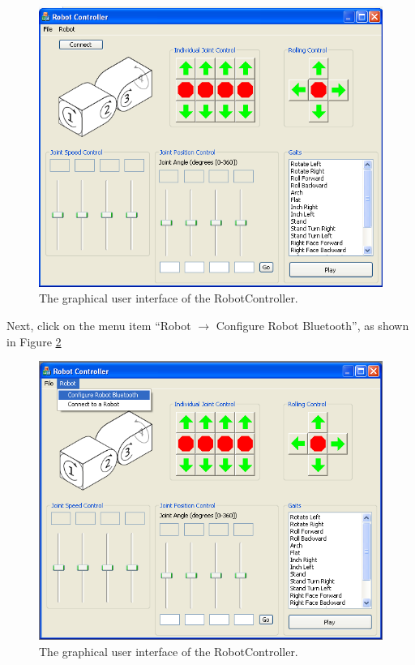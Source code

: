 \documentclass{article}
\begin{document}
\begin{figure}[H]
\begin{center}
\includegraphics[width=4.5in]{images/shot1.png}
\end{center}
\caption{\label{fig:shot1.png} The graphical user interface of the RobotController.}
\end{figure}

Next, click on the menu item ``Robot $\rightarrow$ Configure Robot Bluetooth'', as
shown in Figure \ref{fig:shot3.png}

\begin{figure}[H]
\begin{center}
\includegraphics[width=4.5in]{images/shot3.png}
\end{center}
\caption{\label{fig:shot3.png} The graphical user interface of the RobotController.}
\end{figure}
\end{document}
